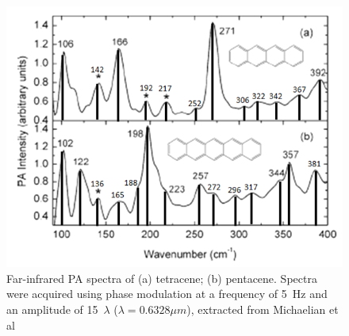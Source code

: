 \begin{figure}[h]
	\centering
	\includegraphics[scale=0.8]{image/spectra-TP}
	\caption[Far-infrared PA spectra of (a) tetracene; (b) pentacene]{Far-infrared PA spectra of (a) tetracene; (b) pentacene. Spectra were acquired using phase modulation at a frequency of 5 Hz and an amplitude of 15 $\lambda$ ($\lambda = 0.6328 \mu m$), extracted from Michaelian et al \cite{michaelian2012far} } \label{spectra-TP}
\end{figure}

